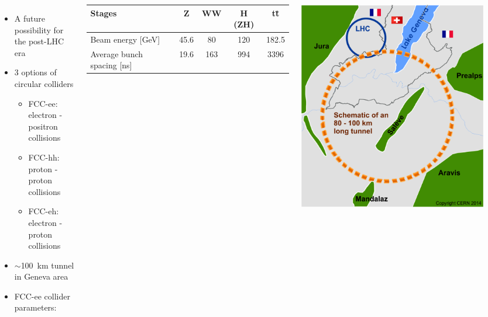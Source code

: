 \documentclass[final,xcolor={dvipsnames,svgnames,x11names,table}]{beamer}
\begin{document}
\begin{frame}
\begin{textblock}{43}
\begin{tcolorbox}[title=The Future Circular Collider Experiment (FCC)]
  \begin{columns}
      \begin{itemize}
        \item A future possibility for the post-LHC era
        \item 3 options of circular colliders
          \begin{itemize}
            \item FCC-ee: electron - positron collisions
            \item FCC-hh: proton - proton collisions
            \item FCC-eh: electron - proton collisions
          \end{itemize}
        \item $\sim$100~km tunnel in Geneva area
        \item FCC-ee collider parameters:
      \end{itemize}
        \centering
      	\begin{tabular}{| l | c | c | c | c |}
        	\toprule
      	   Stages & Z & WW & H (ZH) & t\={t} \\
      	   \midrule
           Beam energy [GeV] & 45.6 & 80 & 120 & 182.5 \\
           Average bunch spacing [ns] & 19.6 & 163 & 994 & 3396\\
      	   \bottomrule
      	\end{tabular}

      \centering
      \includegraphics[width=0.9\textwidth]{Figures/cernFCC}
  \end{columns}


\end{tcolorbox}
\end{textblock}
\end{frame}
\end{document}

